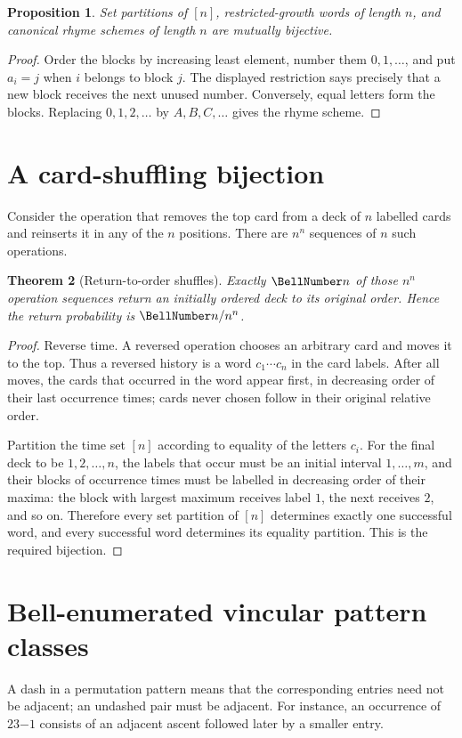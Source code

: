 \documentclass[11pt,a4paper,oneside,openany]{book}
\newtheorem{theorem}{Theorem}[chapter]
\newtheorem{proposition}[theorem]{Proposition}
\theoremstyle{definition}
\theoremstyle{remark}
\begin{document}
\begin{proposition}
Set partitions of $[n]$, restricted-growth words of length $n$, and canonical
rhyme schemes of length $n$ are mutually bijective.
\end{proposition}
\begin{proof}
Order the blocks by increasing least element, number them $0,1,\ldots$, and put
$a_i=j$ when $i$ belongs to block $j$.  The displayed restriction says precisely
that a new block receives the next unused number.  Conversely, equal letters form
the blocks.  Replacing $0,1,2,\ldots$ by $A,B,C,\ldots$ gives the rhyme scheme.
\end{proof}

\section{A card-shuffling bijection}
Consider the operation that removes the top card from a deck of $n$ labelled cards
and reinserts it in any of the $n$ positions.  There are $n^n$ sequences of $n$
such operations.

\begin{theorem}[Return-to-order shuffles]
Exactly $\BellNumber n$ of those $n^n$ operation sequences return an initially ordered
deck to its original order.  Hence the return probability is $\BellNumber n/n^n$.
\end{theorem}
\begin{proof}
Reverse time.  A reversed operation chooses an arbitrary card and moves it to the
top.  Thus a reversed history is a word $c_1\cdots c_n$ in the card labels.  After
all moves, the cards that occurred in the word appear first, in decreasing order of
their last occurrence times; cards never chosen follow in their original relative
order.

Partition the time set $[n]$ according to equality of the letters $c_i$.  For the
final deck to be $1,2,\ldots,n$, the labels that occur must be an initial interval
$1,\ldots,m$, and their blocks of occurrence times must be labelled in decreasing
order of their maxima: the block with largest maximum receives label $1$, the next
receives $2$, and so on.  Therefore every set partition of $[n]$ determines exactly
one successful word, and every successful word determines its equality partition.
This is the required bijection.
\end{proof}

\section{Bell-enumerated vincular pattern classes}
A dash in a permutation pattern means that the corresponding entries need not be
adjacent; an undashed pair must be adjacent.  For instance, an occurrence of
$23\!\mathord{-}\!1$ consists of an adjacent ascent followed later by a smaller
entry.
\end{document}
